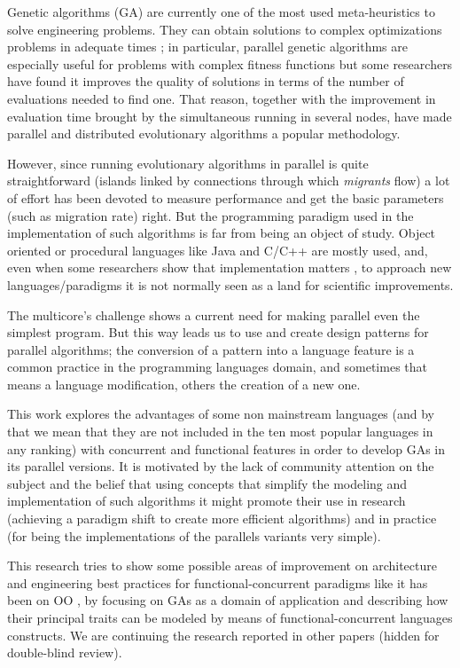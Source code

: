 
\noindent Genetic algorithms (GA) \cite{GA_Goldberg89} are currently one of the most used
meta-heuristics to solve engineering problems. They can obtain
solutions to complex optimizations problems in adequate times
\cite{Luque2011}; in particular, parallel genetic algorithms are
especially useful for problems with complex fitness functions but some
researchers have found \cite{Alba2001} it improves the quality of
solutions in terms of the number of evaluations needed to find
one. That reason, together with the improvement in evaluation time
brought by the simultaneous running in several nodes, have made
parallel and distributed evolutionary algorithms a popular
methodology. 

However, since running evolutionary algorithms in parallel is quite
straightforward (islands linked by connections through which {\em
  migrants} flow) a lot of effort has been devoted to measure
performance and get the basic parameters (such as migration rate)
right. But the programming paradigm used in the implementation of such
algorithms is far from being an object of study. Object oriented or
procedural languages like
Java and C/C++ are mostly used, and, even when some researchers show
that implementation matters \cite{DBLP:conf/iwann/MereloRACML11}, to
approach new languages/paradigms it is not normally seen as a land for
scientific improvements. 

The multicore’s challenge \cite{SutterL05} shows a current need for
making parallel even the simplest program. But this way leads us to
use and create design patterns for parallel algorithms; the conversion
of a pattern into a language feature is a common practice in the
programming languages domain, and sometimes that means a language
modification, others the creation of a new one. 

This work explores the advantages of some non mainstream languages
(and by that we mean that they are not included in the ten most
popular languages in any ranking) with concurrent and functional
features in order to develop GAs in its parallel versions. It is
motivated by the lack of community attention on the subject and the
belief that using concepts that simplify the modeling and
implementation of such algorithms it might promote their use in
research (achieving a paradigm shift to create more efficient
algorithms) and in practice (for being the implementations of the
parallels variants very simple). 

This research tries to show some possible areas of improvement on
architecture and engineering best practices for functional-concurrent
paradigms like it has been on OO \cite{EO:FEA2000}, by focusing on GAs
as a domain of application and describing how their principal traits
can be modeled by means of functional-concurrent languages
constructs. We are continuing the research reported in
other papers (hidden for double-blind review).

